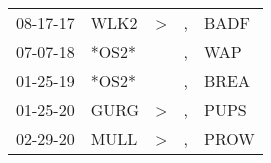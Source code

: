 \begin{supertabular}{p{0.07\textwidth}p{0.06\textwidth}p{0.02\textwidth}p{0.02\textwidth}p{0.06\textwidth}}
          08-17-17\textsuperscript{} &           WLK2\textsuperscript{} &     \textgreater &  , &          BADF\textsuperscript{} \\
          07-07-18\textsuperscript{} &                            *OS2* &                  &  , &           WAP\textsuperscript{} \\
          01-25-19\textsuperscript{} &                            *OS2* &                  &  , &          BREA\textsuperscript{} \\
          01-25-20\textsuperscript{} &           GURG\textsuperscript{} &     \textgreater &  , &          PUPS\textsuperscript{} \\
          02-29-20\textsuperscript{} &           MULL\textsuperscript{} &     \textgreater &  , &          PROW\textsuperscript{} \\
\end{supertabular}
